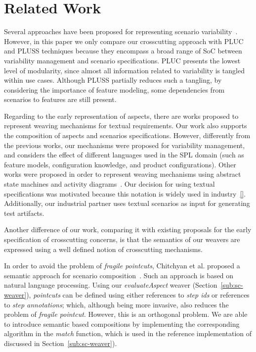 \documentclass{acm_proc_article-sp}
\begin{document}
\section{Related Work}
\label{sec:related}

Several approaches have been proposed for representing
scenario variability~\cite{Jacobson:1997aa,Griss:1998aa, Eriksson:2005aa,Bertolino:2003aa}. However, in this paper
we only compare our crosscutting approach with PLUC and
PLUSS techniques because they encompass a broad range
of SoC between variability management and scenario specifications.
PLUC presents the lowest level of modularity, since
almost all information related to variability is tangled within
use cases. Although PLUSS partially reduces such a tangling,
by considering the importance of feature modeling, some
dependencies from scenarios to features are still present.

Regarding to the early representation of aspects, there are works proposed to
represent weaving mechanisms for textual requirements. Our work also supports the
composition of aspects and scenarios specifications. However, differently from
the previous works, our mechanisms were proposed for variability management, and
considers the effect of different languages used in the SPL domain (such as
feature models, configuration knowledge, and product configurations). Other works
were proposed in order to represent weaving mechanisms using abstract state
machines and activity
diagrams~\cite{Noda:2006aa,Cottenier:2006aa,Alferez:2008aa}. Our decision for
using textual specifications was motivated because this notation is
widely used in industry~\ref{}. Additionally, our industrial partner uses
textual scenarios as input for generating test artifacts.


Another difference of our work, comparing it with existing proposals for the early specification of crosscutting concerns, is that the semantics of our weavers are expressed using a well defined notion of crosscutting mechanisms.

In order to avoid the problem of \emph{fragile pointcuts}, Chitchyan
et al. proposed a semantic approach for scenario
composition~\cite{Chitchyan:2007aa}. Such an approach is based on
natural language processing. Using our \emph{evaluateAspect} weaver
(Section~\ref{sub:sc-weaver}), \emph{pointcuts} can be
defined using either references to \emph{step ids} or references to \emph{step annotations};
which, although being more invasive, also reduces the problem of \emph{fragile pointcut}. However, this is an orthogonal problem. We are able to introduce semantic based compositions by implementing the corresponding algorithm in the \emph{match} function, which is used in the reference implementation of  discussed in Section~\ref{sub:sc-weaver}).
\end{document}
